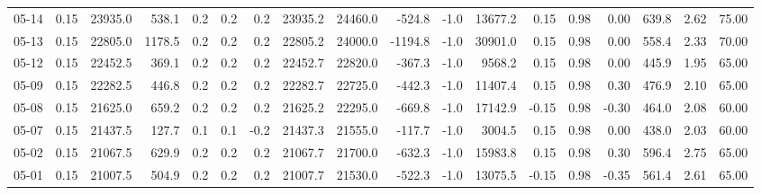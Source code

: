 \begin{threeparttable}
{\begin{tabular}{lrrrrrrrrrrrrrrrrr}
  05-14 &     0.15 & 23935.0 &             538.1 &               0.2 &                0.2 &                0.2 & 23935.2 & 24460.0 &     -524.8 &                     -1.0 &             13677.2 &       0.15 &      0.98 &           0.00 &            639.8 &            2.62 &                  75.00 \\
  05-13 &     0.15 & 22805.0 &            1178.5 &               0.2 &                0.2 &                0.2 & 22805.2 & 24000.0 &    -1194.8 &                     -1.0 &             30901.0 &       0.15 &      0.98 &           0.00 &            558.4 &            2.33 &                  70.00 \\
  05-12 &     0.15 & 22452.5 &             369.1 &               0.2 &                0.2 &                0.2 & 22452.7 & 22820.0 &     -367.3 &                     -1.0 &              9568.2 &       0.15 &      0.98 &           0.00 &            445.9 &            1.95 &                  65.00 \\
  05-09 &     0.15 & 22282.5 &             446.8 &               0.2 &                0.2 &                0.2 & 22282.7 & 22725.0 &     -442.3 &                     -1.0 &             11407.4 &       0.15 &      0.98 &           0.30 &            476.9 &            2.10 &                  65.00 \\
  05-08 &     0.15 & 21625.0 &             659.2 &               0.2 &                0.2 &                0.2 & 21625.2 & 22295.0 &     -669.8 &                     -1.0 &             17142.9 &      -0.15 &      0.98 &          -0.30 &            464.0 &            2.08 &                  60.00 \\
  05-07 &     0.15 & 21437.5 &             127.7 &               0.1 &                0.1 &               -0.2 & 21437.3 & 21555.0 &     -117.7 &                     -1.0 &              3004.5 &       0.15 &      0.98 &           0.00 &            438.0 &            2.03 &                  60.00 \\
  05-02 &     0.15 & 21067.5 &             629.9 &               0.2 &                0.2 &                0.2 & 21067.7 & 21700.0 &     -632.3 &                     -1.0 &             15983.8 &       0.15 &      0.98 &           0.30 &            596.4 &            2.75 &                  65.00 \\
  05-01 &     0.15 & 21007.5 &             504.9 &               0.2 &                0.2 &                0.2 & 21007.7 & 21530.0 &     -522.3 &                     -1.0 &             13075.5 &      -0.15 &      0.98 &          -0.35 &            561.4 &            2.61 &                  65.00 \\

\end{tabular}}
\end{threeparttable}

